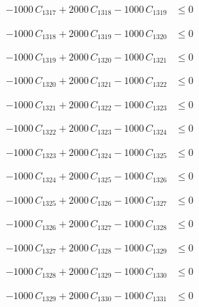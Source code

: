 \documentclass[a4paper,11pt]{article}
\begin{document}
\begin{align}
-1000\,C_{1317} + 2000\,C_{1318} - 1000\,C_{1319} &\leq 0 \nonumber
\end{align}

\begin{align}
-1000\,C_{1318} + 2000\,C_{1319} - 1000\,C_{1320} &\leq 0 \nonumber
\end{align}

\begin{align}
-1000\,C_{1319} + 2000\,C_{1320} - 1000\,C_{1321} &\leq 0 \nonumber
\end{align}

\begin{align}
-1000\,C_{1320} + 2000\,C_{1321} - 1000\,C_{1322} &\leq 0 \nonumber
\end{align}

\begin{align}
-1000\,C_{1321} + 2000\,C_{1322} - 1000\,C_{1323} &\leq 0 \nonumber
\end{align}

\begin{align}
-1000\,C_{1322} + 2000\,C_{1323} - 1000\,C_{1324} &\leq 0 \nonumber
\end{align}

\begin{align}
-1000\,C_{1323} + 2000\,C_{1324} - 1000\,C_{1325} &\leq 0 \nonumber
\end{align}

\begin{align}
-1000\,C_{1324} + 2000\,C_{1325} - 1000\,C_{1326} &\leq 0 \nonumber
\end{align}

\begin{align}
-1000\,C_{1325} + 2000\,C_{1326} - 1000\,C_{1327} &\leq 0 \nonumber
\end{align}

\begin{align}
-1000\,C_{1326} + 2000\,C_{1327} - 1000\,C_{1328} &\leq 0 \nonumber
\end{align}

\begin{align}
-1000\,C_{1327} + 2000\,C_{1328} - 1000\,C_{1329} &\leq 0 \nonumber
\end{align}

\begin{align}
-1000\,C_{1328} + 2000\,C_{1329} - 1000\,C_{1330} &\leq 0 \nonumber
\end{align}

\begin{align}
-1000\,C_{1329} + 2000\,C_{1330} - 1000\,C_{1331} &\leq 0 \nonumber
\end{align}
\end{document}

